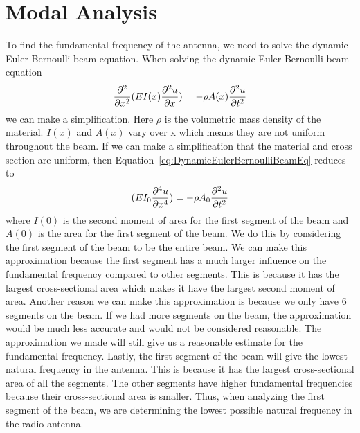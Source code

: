 \documentclass[12pt]{article}
\begin{document}
\section{Modal Analysis}
To find the fundamental frequency of the antenna, we need to solve the dynamic Euler-Bernoulli beam equation. When solving the dynamic Euler-Bernoulli beam equation
\begin{equation}\label{eq:DynamicEulerBernoulliBeamEq}
    \centering
    \frac{\partial^2}{\partial x^2}(EI(x)\frac{\partial^2 u}{\partial x}) = -\rho A(x) \frac{\partial^2 u}{\partial t^2}
\end{equation}
we can make a simplification. Here $\rho$ is the volumetric mass density of the material. $I(x)$ and $A(x)$ vary over x which means they are not uniform throughout the beam. If we can make a simplification that the material and cross section are uniform, then Equation~\eqref{eq:DynamicEulerBernoulliBeamEq} reduces to
\begin{equation}\label{eq:GoverningEqation}
    \centering
    (EI_0\frac{\partial^4 u}{\partial x^4}) = -\rho A_0 \frac{\partial^2 u}{\partial t^2}
\end{equation}
where $I(0)$ is the second moment of area for the first segment of the beam and $A(0)$ is the area for the first segment of the beam. We do this by considering the first segment of the beam to be the entire beam. We can make this approximation because the first segment has a much larger influence on the fundamental frequency compared to other segments. This is because it has the largest cross-sectional area which makes it have the largest second moment of area. Another reason we can make this approximation is because we only have 6 segments on the beam. If we had more segments on the beam, the approximation would be much less accurate and would not be considered reasonable. The approximation we made will still give us a reasonable estimate for the fundamental frequency. Lastly, the first segment of the beam will give the lowest natural frequency in the antenna. This is because it has the largest cross-sectional area of all the segments. The other segments have higher fundamental frequencies because their cross-sectional area is smaller. Thus, when analyzing the first segment of the beam, we are determining the lowest possible natural frequency in the radio antenna.
\end{document}
